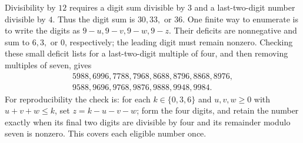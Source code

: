 Divisibility by $12$ requires a digit sum divisible by $3$ and a last-two-digit number divisible by $4$. Thus the digit sum is $30,33,$ or $36$. One finite way to enumerate is to write the digits as $9-u,9-v,9-w,9-z$. Their deficits are nonnegative and sum to $6,3,$ or $0$, respectively; the leading digit must remain nonzero. Checking these small deficit lists for a last-two-digit multiple of four, and then removing multiples of seven, gives
\[\boxed{\begin{gathered}5988,6996,7788,7968,8688,8796,8868,8976,\\9588,9696,9768,9876,9888,9948,9984.\end{gathered}}\]
For reproducibility the check is: for each $k\in\{0,3,6\}$ and $u,v,w\ge0$ with $u+v+w\le k$, set $z=k-u-v-w$; form the four digits, and retain the number exactly when its final two digits are divisible by four and its remainder modulo seven is nonzero. This covers each eligible number once.
